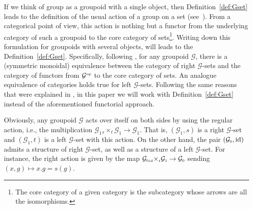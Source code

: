 \documentclass[10pt,a4paper]{amsart}
\numberwithin{equation}{section}
\newcommand{\Go}{\cG_{\Sscript{0}}}
\newcommand{\Ga}{\cG_{\Sscript{1}}}
\newcommand{\cG}{{\mathcal G}}
\newcommand{\Sscript}[1]{\scriptscriptstyle{#1}}
\newcommand{\due}[3]{{}_{{#2 }} {#1}_{{ #3}} }
\begin{document}
\begin{Remark}\label{rem:GrpdSets}If we think of group as a groupoid with a single object, then Definition~\ref{def:Gset} leads to the definition of the usual action of a group on a set (see~\cite{Bouc:2010}). From a categorical point of view, this action is nothing but a functor from the underlying category of such a groupoid to the core category of sets\footnote{The core category of a given category is the subcategory whose arrows are all the isomorphisms.}. Writing down this formulation for groupoids with several objects, will leads to the Definition~\ref{def:Gset}. Specifically, following \cite[Remark~2.6]{Kaoutit/Spinosa:2018}, for any groupoid $\cG$, there is a (symmetric monoidal) equivalence between the category of right $\cG$-sets and the category of functors from $\cG^{\Sscript{\rm op}}$ to the core category of sets. An analogue equivalence of categories holds true for left $\cG$-sets. Following the same reasons that were explained in \cite[Remark 2.6, Section~5.3]{Kaoutit/Spinosa:2018}, in this paper we will work with Definition~\ref{def:Gset} instead of the aforementioned functorial approach.
\end{Remark}

Obviously, any groupoid $\cG$ acts over itself on both sides by using the regular action, i.e., the multiplication $\Ga \due \times {\Sscript{{s}}} { \Sscript{{t}}} \Ga \to \Ga$. That is, $(\Ga, {s})$ is a right $\cG$-set and $(\Ga, {t})$ is a left $\cG$-set with this action. On the other hand, the pair $(\Go, {\rm id})$ admits a structure of right $\cG$-set, as well as a structure of a left $\cG$-set. For instance, the right action is given by the map $\Go \due \times {\Sscript{{\rm id}}} { \Sscript{{t}}} \Ga \to \Go$ sending $(x,g) \mapsto x . g= s(g)$.
\end{document}
